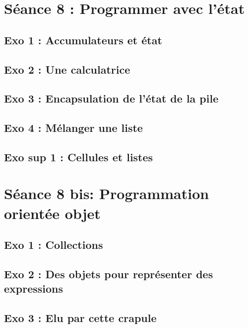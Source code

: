 \newpage
\section{Séance 8 : Programmer avec l'état}

\subsection{Exo 1 : Accumulateurs et état}


\subsection{Exo 2 : Une calculatrice}


\subsection{Exo 3 : Encapsulation de l'état de la pile}


\subsection{Exo 4 : Mélanger une liste}


\subsection{Exo sup 1 : Cellules et listes}



\newpage
\section{Séance 8 bis: Programmation orientée objet}
\subsection{Exo 1 : Collections}


\subsection{Exo 2 : Des objets pour représenter des expressions}


\subsection{Exo 3 : Elu par cette crapule}



